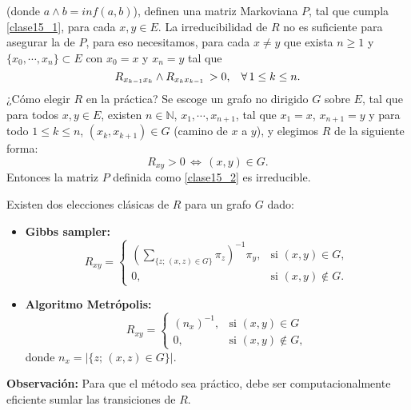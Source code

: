 \documentclass[a4paper]{article}
\numberwithin{equation}{subsection}
\numberwithin{definicion}{subsection}
\def\N{\mathbb N}
\begin{document}
(donde $a\wedge b = inf(a,b)$), definen una matriz Markoviana $P$, tal que cumpla \ref{clase15_1}, para cada $x,y\in E$. La irreducibilidad de $R$ no es suficiente para asegurar la de $P$, para eso necesitamos, para cada $x\neq y$ que exista $n\geq 1$ y $\{x_0,\cdots,x_n\} \subset E$ con $x_0 = x$ y $x_n=y$ tal que
\[R_{x_{k-1}x_k}\wedge R_{x_kx_{k-1}}\,>0,\hspace{0.3cm}\forall\,1\leq k\leq n.\]
¿Cómo elegir $R$ en la práctica? Se escoge un grafo no dirigido $G$ sobre $E$, tal que para todos $x,y\in E$, existen $n\in \N$, $x_1,\cdots,x_{n+1}$, tal que $x_1=x$, $x_{n+1}=y$ y para todo $1\leq k\leq n$, $(x_k,x_{k+1})\in G$ (camino de $x$ a $y$), y elegimos $R$ de la siguiente forma:
\[R_{xy} >0\,\Longleftrightarrow\,(x,y)\in G.\]
Entonces la matriz $P$ definida como \ref{clase15_2} es irreducible.\\ \newline

Existen dos elecciones clásicas de $R$ para un grafo $G$ dado:
\begin{itemize}
    \item \textbf{Gibbs sampler: }
    \[R_{xy} = \begin{cases}
                \left(\sum_{\{z;\,(x,z)\in G\}}\pi_z\right)^{-1}\pi_y, & \text{si }(x,y)\in G,\\
                0, & \text{si }(x,y) \notin G.
                \end{cases}\]
    \item \textbf{Algoritmo Metrópolis: }
    \[R_{xy} = \begin{cases}
                (n_x)^{-1}, & \text{si }(x,y)\in G\\
                0, & \text{si }(x,y)\notin G,
                \end{cases}\]
    donde $n_x = |\{z;\,(x,z)\in G\}|$.
\end{itemize}
\textbf{Observación: }Para que el método sea práctico, debe ser computacionalmente eficiente sumlar las transiciones de $R$.\\ \newline
\end{document}
